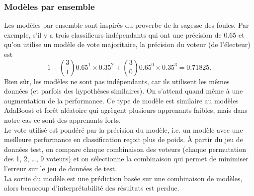 \subsubsection{Modèles par ensemble}

Les modèles par ensemble sont inspirés du proverbe de la sagesse des foules. Par exemple, s'il y a trois classifieurs indépendants qui ont une précision de 0.65 et qu'on utilise un modèle de vote majoritaire, la précision du voteur (de l'électeur) est 
$$1 - \binom{3}{1}0.65^1\times 0.35^2 + \binom{3}{0}0.65^0\times 0.35^3 = 0.71825.$$
Bien sûr, les modèles ne sont pas indépendants, car ils utilisent les mêmes données (et parfois des hypothèses similaires). On s'attend quand même à une augmentation de la performance. Ce type de modèle est similaire au modèles AdaBoost et forêt aléatoire qui agrègent plusieurs apprenants faibles, mais dans notre cas ce sont des apprenants forts.\\

Le vote utilisé est pondéré par la précision du modèle, i.e. un modèle avec une meilleure performance en classification reçoit plus de poids. À partir du jeu de données test, on compare chaque combinaison des voteurs (chaque permutation des 1, 2, \dots, 9 voteurs) et on sélectionne la combinaison qui permet de minimiser l'erreur sur le jeu de données de test.\\

La sortie du modèle est une prédiction basée sur une combinaison de modèles, alors beaucoup d'interprétabilité des résultats est perdue.
